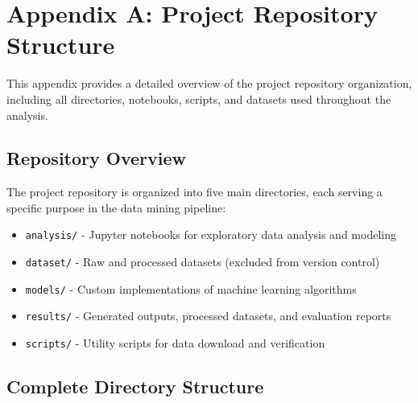 \chapter*{Appendix A: Project Repository Structure}

This appendix provides a detailed overview of the project repository organization, including all directories, notebooks, scripts, and datasets used throughout the analysis.

\section*{Repository Overview}
The project repository is organized into five main directories, each serving a specific purpose in the data mining pipeline:

\begin{itemize}
    \item \texttt{analysis/} - Jupyter notebooks for exploratory data analysis and modeling
    \item \texttt{dataset/} - Raw and processed datasets (excluded from version control)
    \item \texttt{models/} - Custom implementations of machine learning algorithms
    \item \texttt{results/} - Generated outputs, processed datasets, and evaluation reports
    \item \texttt{scripts/} - Utility scripts for data download and verification
\end{itemize}

\section*{Complete Directory Structure}

